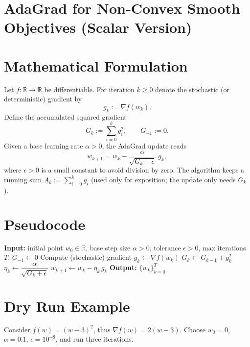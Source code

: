 \documentclass{article}
\begin{document}
\section*{AdaGrad for Non‑Convex Smooth Objectives (Scalar Version)}

\section*{Mathematical Formulation}
Let $f:\mathbb{R}\rightarrow\mathbb{R}$ be differentiable.  
For iteration $k\ge 0$ denote the stochastic (or deterministic) gradient by
\[
g_k:=\nabla f(w_k).
\]
Define the accumulated squared gradient
\[
G_k:=\sum_{i=0}^{k} g_i^{2},\qquad G_{-1}:=0 .
\]
Given a base learning rate $\alpha>0$, the AdaGrad update reads
\begin{equation}
\label{eq:update}
w_{k+1}=w_{k}-\frac{\alpha}{\sqrt{G_k+\epsilon}}\;g_k,
\end{equation}
where $\epsilon>0$ is a small constant to avoid division by zero.  
The algorithm keeps a running sum $A_k:=\sum_{i=0}^{k} g_i$ (used only for exposition; the update only needs $G_k$).

\section*{Pseudocode}
\begin{algorithm}[H]
\caption{Scalar AdaGrad for Non‑Convex $f$}
\begin{algorithmic}[1]
\State \textbf{Input:} initial point $w_0\in\mathbb{R}$, base step size $\alpha>0$, tolerance $\epsilon>0$, max iterations $T$.
\State $G_{-1}\gets 0$ 
    \State Compute (stochastic) gradient $g_k \gets \nabla f(w_k)$
    \State $G_k \gets G_{k-1}+g_k^{2}$
    \State $\eta_k \gets \dfrac{\alpha}{\sqrt{G_k+\epsilon}}$
    \State $w_{k+1} \gets w_k-\eta_k\,g_k$
\EndFor
\State \textbf{Output:} $\{w_k\}_{k=0}^{T}$
\end{algorithmic}
\end{algorithm}

\section*{Dry Run Example}
Consider $f(w)=(w-3)^2$, thus $\nabla f(w)=2(w-3)$.  
Choose $w_0=0$, $\alpha=0.1$, $\epsilon=10^{-8}$, and run three iterations.
\end{document}

